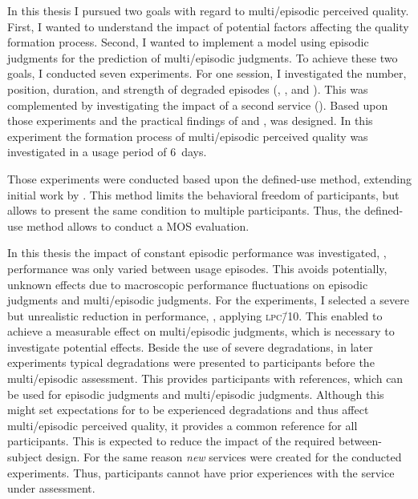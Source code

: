 In this thesis I pursued two goals with regard to multi\-/episodic perceived quality.
First, I wanted to understand the impact of potential factors affecting the quality formation process.
Second, I wanted to implement a model using episodic judgments for the prediction of multi\-/episodic judgments.
To achieve these two goals, I conducted seven experiments.
For one session, I investigated the number, position, duration, and strength of degraded episodes (, \EIIa{}, and ).
This was complemented by investigating the impact of a second service (\EIIb{}).
Based upon those experiments and the practical findings of  and ,  was designed.
In this experiment the formation process of multi\-/episodic perceived quality was investigated in a usage period of 6~days.

Those experiments were conducted based upon the defined-use method, extending initial work by \citet{moller_single-call_2011}.
This method limits the behavioral freedom of participants, but allows to present the same condition to multiple participants.
Thus, the defined-use method allows to conduct a \ac{MOS} evaluation.

In this thesis the impact of constant episodic performance was investigated, \ie, performance was only varied between usage episodes.
This avoids potentially, unknown effects due to macroscopic performance fluctuations on episodic judgments and multi\-/episodic judgments.
For the experiments, I selected a severe but unrealistic reduction in performance, \ie, applying \textsc{\lowercase{LPC\=/10}}.
This enabled to achieve a measurable effect on multi\-/episodic judgments, which is necessary to investigate potential effects.
Beside the use of severe degradations, in later experiments typical degradations were presented to participants before the multi\-/episodic assessment.
This provides participants with references, which can be used for episodic judgments and multi\-/episodic judgments.
Although this might set expectations for to be experienced degradations and thus affect multi\-/episodic perceived quality, it provides a common reference for all participants.
This is expected to reduce the impact of the required between-subject design.
For the same reason \emph{new} services were created for the conducted experiments.
Thus, participants cannot have prior experiences with the service under assessment.

